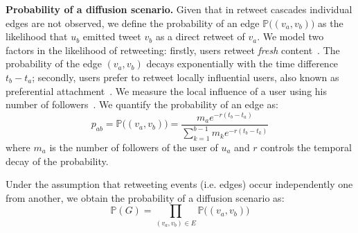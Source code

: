 \textbf{Probability of a diffusion scenario.}
Given that in retweet cascades individual edges are not observed,
we define the probability of an edge $\mathds{P}\big((v_a, v_b)\big)$ as the likelihood that $u_b$ emitted tweet $v_b$ as a direct retweet of $v_a$.
We model two factors in the likelihood of retweeting:
firstly, users retweet \emph{fresh} content~\cite{Wu2007}.
The probability of the edge $(v_a, v_b)$ decays exponentially with the time difference $t_b - t_a$;
secondly, users prefer to retweet locally influential users, also known as preferential attachment~\cite{Barabasi2005}.
We measure the local influence of a user using his number of followers~\cite{kwak2010twitter,Cha2010,Rizoiu2017}.
We quantify the probability of an edge as:
\begin{equation} \label{eq:prob-edge}
	p_{ab} = \mathds{P}\big((v_a, v_b)\big) = \frac{m_a e^{-r({t_b-t_a})}}{\sum_{k=1}^{b-1} m_k e^{-r({t_b-t_k})}}
\end{equation}
where 
$m_a$ is the number of followers of the user of $u_a$ and
$r$ controls the temporal decay of the probability.

Under the assumption that retweeting events (i.e. edges) occur independently one from another, we obtain the probability of a diffusion scenario as:
%
\begin{equation} \label{eq:prob-scenario}
	\mathds{P}(G) = \prod_{(v_a,v_b) \in E} \mathds{P}\big((v_a, v_b)\big)
\end{equation}

